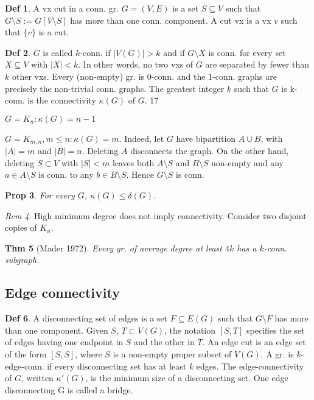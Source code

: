 \documentclass[11pt, fleqn, a4paper, landscape]{article}
\theoremstyle{plain} %
\newtheorem{thm}{Thm}
\newtheorem{pro}[thm]{Prop}
\theoremstyle{remark} %
\newtheorem{rem}[thm]{Rem}
\theoremstyle{definition} %
\newtheorem{defi}[thm]{Def}
\begin{document}
\begin{multicols}{5}
\begin{defi}
A vx cut in a conn. gr. $G = (V,E)$ is a set $ S \subseteq V$ such that $G\setminus S := G[V \setminus S]$ has more than one conn. component. A cut vx is a vx $v$ such that $\{v\}$ is a cut.
\end{defi}
\begin{defi}
$G$ is called $k$-conn. if $|V (G)|> k$ and if $G\setminus X$ is conn. for every set $X \subseteq V$ with $|X|< k$. In other words, no two vxs of $G$ are separated by fewer than $k$ other vxs. Every (non-empty) gr. is 0-conn. and the 1-conn. graphs are precisely the non-trivial conn. graphs. The greatest integer $k$ such that $G$ is k-conn. is the connectivity $\kappa (G)$ of $G$.
17
\item $G = K_n: \kappa (G) = n - 1$
\item $G = K_{m,n}, m \le n: \kappa (G) = m$. Indeed, let $G$ have bipartition $A \cup B$, with $|A|= m$  and $|B|= n$. Deleting $A$ disconnects the graph. On the other hand, deleting $S \subset V$ with $|S|< m$ leaves both $A\setminus S$ and $B\setminus S$ non-empty and any $a \in A\setminus S$ is conn. to any $b \in B \setminus S$. Hence $G\setminus S$ is conn.
\end{defi}
\begin{pro}
For every $G$, $\kappa (G) \le \delta(G)$.
\end{pro} 

\begin{rem}
High minimum degree does not imply connectivity. Consider two disjoint copies of $K_n$.
\end{rem}
\begin{thm}[Mader 1972]
Every gr. of average degree at least $4k$ has a $k$-conn. subgraph.
\end{thm}

\subsection{Edge connectivity}
\begin{defi}
A disconnecting set of edges is a set $F \subseteq E(G)$ such that $G\setminus F$ has more than one component. Given $S$, $T \subset V (G)$, the notation $[S, T]$ specifies the set of edges having one endpoint
in $S$ and the other in $T$. An edge cut is an edge set of the form $[S, S]$, where $S$ is a non-empty proper subset of $V (G)$. A gr. is $k$-edge-conn. if every disconnecting set has at least $k$ edges.
The edge-connectivity of $G$, written $\kappa'(G)$, is the minimum size of a disconnecting set. One edge disconnecting G is called a bridge.


\end{defi}
\end{multicols}
\end{document}
